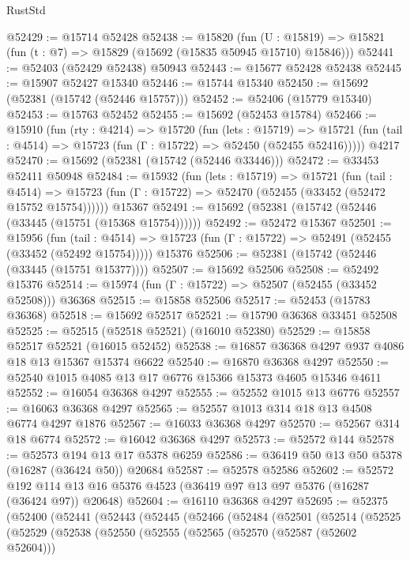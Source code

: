 \begin{lexlean}{RustStd}
\begin{coremodule}
@52429 := @15714 @52428
@52438 := @15820
    (fun (U : @15819) => @15821 (fun (t : @7) => @15829 (@15692 (@15835 @50945 @15710) @15846)))
@52441 := @52403 (@52429 @52438) @50943
@52443 := @15677 @52428 @52438
@52445 := @15907 @52427 @15340
@52446 := @15744 @15340
@52450 := @15692 (@52381 (@15742 (@52446 @15757)))
@52452 := @52406 (@15779 @15340)
@52453 := @15763 @52452
@52455 := @15692 (@52453 @15784)
@52466 := @15910
    (fun (rty : @4214) =>
    @15720
      (fun (lets : @15719) =>
      @15721 (fun (tail : @4514) => @15723 (fun (Γ : @15722) => @52450 (@52455 @52416)))))
    @4217
@52470 := @15692 (@52381 (@15742 (@52446 @33446)))
@52472 := @33453 @52411 @50948
@52484 := @15932
    (fun (lets : @15719) =>
    @15721
      (fun (tail : @4514) =>
      @15723 (fun (Γ : @15722) => @52470 (@52455 (@33452 (@52472 @15752 @15754))))))
    @15367
@52491 := @15692 (@52381 (@15742 (@52446 (@33445 (@15751 (@15368 @15754))))))
@52492 := @52472 @15367
@52501 := @15956
    (fun (tail : @4514) => @15723 (fun (Γ : @15722) => @52491 (@52455 (@33452 (@52492 @15754)))))
    @15376
@52506 := @52381 (@15742 (@52446 (@33445 (@15751 @15377))))
@52507 := @15692 @52506
@52508 := @52492 @15376
@52514 := @15974 (fun (Γ : @15722) => @52507 (@52455 (@33452 @52508))) @36368
@52515 := @15858 @52506
@52517 := @52453 (@15783 @36368)
@52518 := @15692 @52517
@52521 := @15790 @36368 @33451 @52508
@52525 := @52515 (@52518 @52521) (@16010 @52380)
@52529 := @15858 @52517 @52521 (@16015 @52452)
@52538 := @16857 @36368 @4297 @937 @4086 @18 @13 @15367 @15374 @6622
@52540 := @16870 @36368 @4297
@52550 := @52540 @1015 @4085 @13 @17 @6776 @15366 @15373 @4605 @15346 @4611
@52552 := @16054 @36368 @4297
@52555 := @52552 @1015 @13 @6776
@52557 := @16063 @36368 @4297
@52565 := @52557 @1013 @314 @18 @13 @4508 @6774 @4297 @1876
@52567 := @16033 @36368 @4297
@52570 := @52567 @314 @18 @6774
@52572 := @16042 @36368 @4297
@52573 := @52572 @144
@52578 := @52573 @194 @13 @17 @5378 @6259
@52586 := @36419 @50 @13 @50 @5378 (@16287 (@36424 @50)) @20684
@52587 := @52578 @52586
@52602 := @52572
    @192
    @114
    @13
    @16
    @5376
    @4523
    (@36419 @97 @13 @97 @5376 (@16287 (@36424 @97)) @20648)
@52604 := @16110 @36368 @4297
@52695 := @52375
    (@52400
      (@52441
        (@52443
          (@52445
            (@52466
              (@52484
                (@52501
                  (@52514
                    (@52525
                      (@52529
                        (@52538
                          (@52550
                            (@52555
                              (@52565
                                (@52570 (@52587 (@52602 @52604)))

\end{coremodule}
\end{lexlean}
